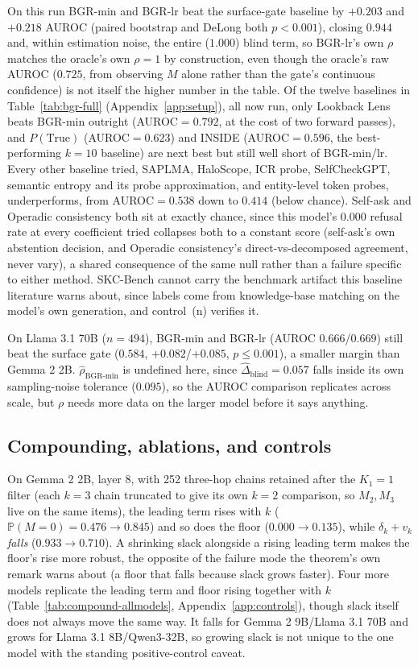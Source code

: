 \documentclass{article}
\begin{document}
On this run BGR-min and BGR-lr beat the surface-gate baseline by $+0.203$ and $+0.218$ AUROC
(paired bootstrap and DeLong both $p<0.001$), closing $0.944$ and, within estimation noise, the
entire ($1.000$) blind term, so BGR-lr's own $\rho$ matches the oracle's own $\rho=1$ by construction,
even though the oracle's raw AUROC ($0.725$, from observing $M$ alone rather than the gate's
continuous confidence) is not itself the higher number in the table. Of the twelve baselines in Table~\ref{tab:bgr-full}
(Appendix~\ref{app:setup}), all now run, only Lookback Lens beats BGR-min outright (AUROC$=0.792$, at
the cost of two forward passes), and $P(\text{True})$ \citep{kadavath2022know} (AUROC$=0.623$) and
INSIDE (AUROC$=0.596$, the best-performing $k{=}10$ baseline) are next best but still well short of
BGR-min/lr. Every other baseline tried, SAPLMA, HaloScope, ICR probe, SelfCheckGPT, semantic entropy
and its probe approximation, and entity-level token probes, underperforms, from AUROC$=0.538$ down to
$0.414$ (below chance). Self-ask and Operadic consistency
\citep{bottman2026operadic} both sit at exactly chance, since this model's $0.000$ refusal rate at
every coefficient tried collapses both to a constant score (self-ask's own abstention decision, and
Operadic consistency's direct-vs-decomposed agreement, never vary), a shared consequence of the same
null rather than a failure specific to either method. SKC-Bench cannot carry the benchmark artifact
this baseline literature warns about, since labels come from knowledge-base matching on the model's
own generation, and control~(n) verifies it.

On Llama 3.1 70B ($n=494$), BGR-min and BGR-lr (AUROC $0.666$/$0.669$) still beat the surface gate
($0.584$, $+0.082$/$+0.085$, $p\le0.001$), a smaller margin than Gemma 2 2B. $\hat\rho_{\text{BGR-min}}$
is undefined here, since $\widehat\Delta_{\mathrm{blind}}=0.057$ falls inside its own sampling-noise
tolerance ($0.095$), so the AUROC comparison replicates across scale, but $\rho$ needs more
data on the larger model before it says anything.

\subsection{Compounding, ablations, and controls}

On Gemma 2 2B, layer 8, with 252 three-hop chains retained after the $K_1{=}1$ filter (each $k{=}3$
chain truncated to give its own $k{=}2$ comparison, so $M_2, M_3$ live on the same items), the leading
term rises with $k$ ($\mathbb{P}(M{=}0)=0.476\to0.845$) and so does the floor ($0.000\to0.135$),
while $\delta_k+v_k$ \emph{falls} ($0.933\to0.710$). A shrinking slack alongside a rising leading
term makes the floor's rise more robust, the opposite of the failure mode the theorem's own remark
warns about (a floor that falls because slack grows faster). Four more models replicate the leading
term and floor rising together with $k$ (Table~\ref{tab:compound-allmodels}, Appendix~\ref{app:controls}),
though slack itself does not always move the same way. It falls for Gemma 2 9B/Llama 3.1 70B and
grows for Llama 3.1 8B/Qwen3-32B, so growing slack is not unique to the one model with the standing
positive-control caveat.
\end{document}
